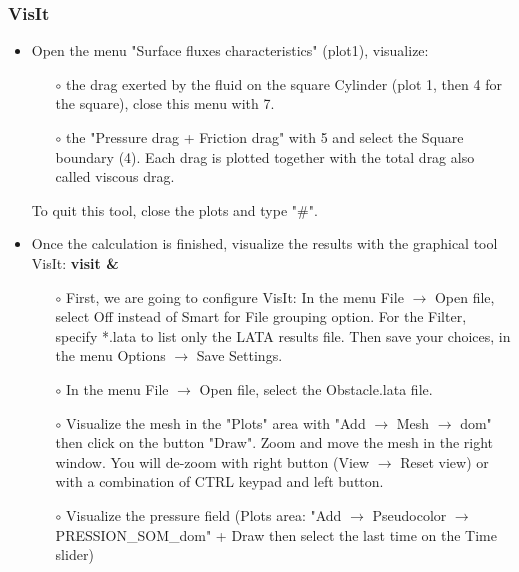 \documentclass[10pt]{beamer}
\begin{document}
\begin{frame}
\frametitle{VisIt}
\begin{block}{}

\begin{itemize}
\item Open the menu "Surface fluxes characteristics" (plot1), visualize:
    \begin{itemize}
    \item [$\circ$] the drag exerted by the fluid on the square Cylinder (plot 1, then 4 for the square), close this menu with 7.
    \item [$\circ$] the "Pressure drag + Friction drag" with 5 and select the Square boundary (4). Each drag is plotted together with the total drag also called viscous drag.
    \end{itemize}
To quit this tool, close the plots and type "\#".

\item Once the calculation is finished, visualize the results with the graphical tool VisIt: \textbf{visit \&}

    \begin{itemize}
    \item [$\circ$] First, we are going to configure VisIt: {\footnotesize{In the menu File $\rightarrow$ Open file, select Off instead of Smart for File grouping option. For the Filter, specify *.lata to list only the LATA results file. Then save your choices, in the menu Options $\rightarrow$ Save Settings.}}

    \item [$\circ$] In the menu File $\rightarrow$ Open file, select the Obstacle.lata file.

    \item [$\circ$] Visualize the mesh in the "Plots" area with "Add $\rightarrow$ Mesh $\rightarrow$ dom" then click on the button "Draw". Zoom and move the mesh in the right window. You will de-zoom with right button (View $\rightarrow$ Reset view) or with a combination of CTRL keypad and left button.

    \item [$\circ$] Visualize the pressure field ({\footnotesize{Plots area: "Add $\rightarrow$ Pseudocolor $\rightarrow$ PRESSION\_SOM\_dom" + Draw then select the last time on the Time slider}})
    \end{itemize}
\end{itemize}

\end{block}
\end{frame}
\end{document}
